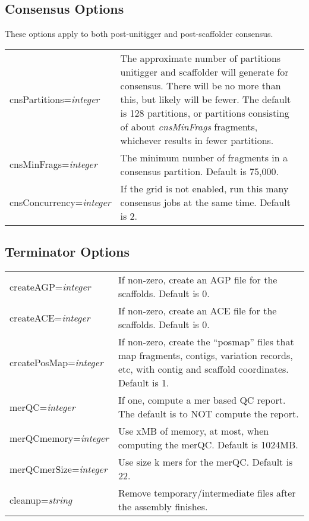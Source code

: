 \documentclass[twoside,11pt]{article}
\begin{document}
\subsection{Consensus Options}

These options apply to both post-unitigger and post-scaffolder consensus.

\begin{longtable}{lp{3.0in}}
cnsPartitions={\it integer} &
The approximate number of partitions unitigger and scaffolder will
generate for consensus.  There will be no more than this, but likely
will be fewer.  The default is 128 partitions, or partitions
consisting of about {\it cnsMinFrags} fragments, whichever results in fewer
partitions.
\\

cnsMinFrags={\it integer} &
The minimum number of fragments in a consensus partition.  Default
is 75,000.
\\

cnsConcurrency={\it integer} &
If the grid is not enabled, run this many consensus jobs at the same
time.  Default is 2.
\\
\end{longtable}


\subsection{Terminator Options}
\begin{longtable}{lp{3.0in}}
createAGP={\it integer} &
If non-zero, create an AGP file for the scaffolds.  Default is 0.
\\

createACE={\it integer} &
If non-zero, create an ACE file for the scaffolds.  Default is 0.
\\

createPosMap={\it integer} &
If non-zero, create the ``posmap'' files that map fragments, contigs,
variation records, etc, with contig and scaffold coordinates.  Default
is 1.
\\

merQC={\it integer} &
If one, compute a mer based QC report.  The default is to NOT compute the report.
\\

merQCmemory={\it integer} &
Use xMB of memory, at most, when computing the merQC.  Default is 1024MB.
\\

merQCmerSize={\it integer} &
Use size k mers for the merQC.  Default is 22.
\\

cleanup={\it string} &
Remove temporary/intermediate files after the assembly finishes.
\\

\end{longtable}
\end{document}
